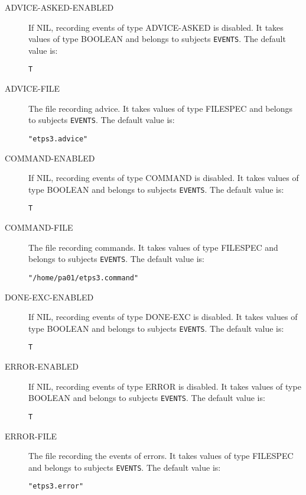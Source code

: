 \begin{description} 
\item[ADVICE-ASKED-ENABLED]  
If NIL, recording events of type ADVICE-ASKED is disabled.
It takes values of type BOOLEAN and belongs to subjects \texttt{EVENTS}.  The default value is: \begin{lstlisting}
T
\end{lstlisting}

\item[ADVICE-FILE]  
The file recording advice.
It takes values of type FILESPEC and belongs to subjects \texttt{EVENTS}.  The default value is: \begin{lstlisting}
"etps3.advice"
\end{lstlisting}

\item[COMMAND-ENABLED]  
If NIL, recording events of type COMMAND is disabled.
It takes values of type BOOLEAN and belongs to subjects \texttt{EVENTS}.  The default value is: \begin{lstlisting}
T
\end{lstlisting}

\item[COMMAND-FILE]  
The file recording commands.
It takes values of type FILESPEC and belongs to subjects \texttt{EVENTS}.  The default value is: \begin{lstlisting}
"/home/pa01/etps3.command"
\end{lstlisting}

\item[DONE-EXC-ENABLED]  
If NIL, recording events of type DONE-EXC is disabled.
It takes values of type BOOLEAN and belongs to subjects \texttt{EVENTS}.  The default value is: \begin{lstlisting}
T
\end{lstlisting}

\item[ERROR-ENABLED]  
If NIL, recording events of type ERROR is disabled.
It takes values of type BOOLEAN and belongs to subjects \texttt{EVENTS}.  The default value is: \begin{lstlisting}
T
\end{lstlisting}

\item[ERROR-FILE]  
The file recording the events of errors.
It takes values of type FILESPEC and belongs to subjects \texttt{EVENTS}.  The default value is: \begin{lstlisting}
"etps3.error"
\end{lstlisting}


\end{description}
